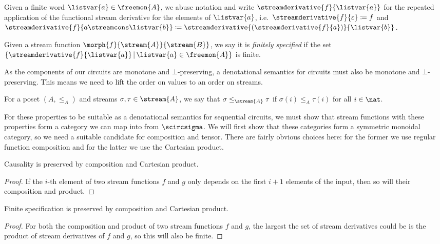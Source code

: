 \documentclass{lmcs}
\begin{document}
\begin{nota}
    Given a finite word \(\listvar{a} \in \freemon{A}\), we abuse notation
    and write \(\streamderivative{f}{\listvar{a}}\) for the repeated
    application of the functional stream derivative for the elements of
    \(\listvar{a}\), i.e.\ \(
    \streamderivative{f}{\varepsilon} \coloneqq f
    \) and \(
    \streamderivative{f}{a \streamcons \listvar{b}} \coloneqq
    \streamderivative{(\streamderivative{f}{a})}{\listvar{b}}
    \).
\end{nota}

\begin{defi}
    Given a stream function \(\morph{f}{\stream{A}}{\stream{B}}\), we say it is
    \emph{finitely specified} if the set \(\{
    \streamderivative{f}{\listvar{a}} \,|\, \listvar{a} \in \freemon{A}
    \}\) is finite.
\end{defi}

As the components of our circuits are monotone and \(\bot\)-preserving, a
denotational semantics for circuits must also be monotone and
\(\bot\)-preserving.
This means we need to lift the order on values to an order on streams.

\begin{nota}
    For a poset \((A, \leq_A)\) and streams \(\sigma,\tau \in \stream{A}\), we
    say that \(\sigma \leq_{\stream{A}} \tau\) if \(\sigma(i) \leq_A \tau(i)\)
    for all \(i \in \nat\).
\end{nota}

For these properties to be suitable as a denotational semantics for
sequential circuits, we must show that stream functions with these
properties form a category we can map into from \(\scircsigma\).
We will first show that these categories form a symmetric monoidal category, so
we need a suitable candidate for composition and tensor.
There are fairly obvious choices here: for the former we use regular function
composition and for the latter we use the Cartesian product.

\begin{lem}\label{lem:causality-preserved}
    Causality is preserved by composition and Cartesian product.
\end{lem}
\begin{proof}
    If the \(i\)-th element of two stream functions \(f\) and \(g\) only depends
    on the first \(i+1\) elements of the input, then so will their composition
    and product.
\end{proof}

\begin{lem}\label{lem:finitely-specified-preserved}
    Finite specification is preserved by composition and Cartesian
    product.
\end{lem}
\begin{proof}
    For both the composition and product of two stream functions \(f\) and
    \(g\), the largest the set of stream derivatives could be is the product of
    stream derivatives of \(f\) and \(g\), so this will also be finite.
\end{proof}
\end{document}
